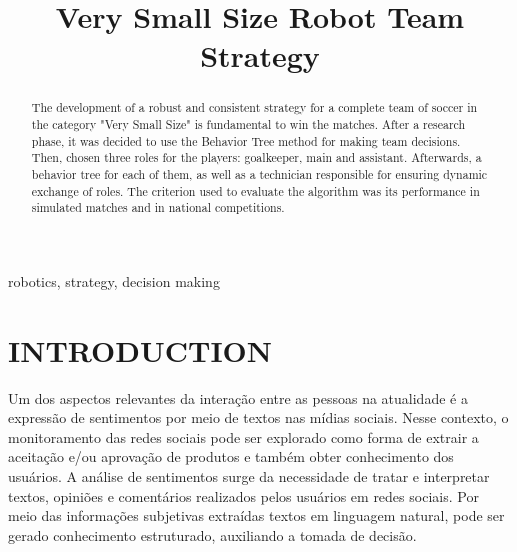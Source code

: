 \documentclass[conference]{IEEEtran}
\begin{document}
\title{Very Small Size Robot Team Strategy\\
}

\author{
\and
{}
\and
{}
}

\maketitle


\begin{abstract}
The development of a robust and consistent strategy for a complete team of soccer in the category "Very Small Size" is fundamental to win the matches. After a research phase, it was decided to use the Behavior Tree method for making team decisions. Then, chosen three roles for the players: goalkeeper, main and assistant. Afterwards, a behavior tree for each of them, as well as a technician responsible for ensuring dynamic exchange of roles. The criterion used to evaluate the algorithm was its performance in simulated matches and in national competitions.
\end{abstract}

\begin{IEEEkeywords}
robotics, strategy, decision making
\end{IEEEkeywords}

\section{INTRODUCTION}
Um dos aspectos relevantes da interação entre as pessoas na atualidade é a expressão de sentimentos por meio de textos nas mídias sociais. Nesse contexto, o monitoramento das redes sociais pode ser explorado como forma de extrair a aceitação e/ou aprovação de produtos e também obter conhecimento dos usuários. A análise de sentimentos surge da necessidade de tratar e interpretar textos, opiniões e comentários realizados pelos usuários em redes sociais. Por meio das informações subjetivas extraídas textos em linguagem natural, pode ser gerado conhecimento estruturado, auxiliando a tomada de decisão. 
\end{document}
